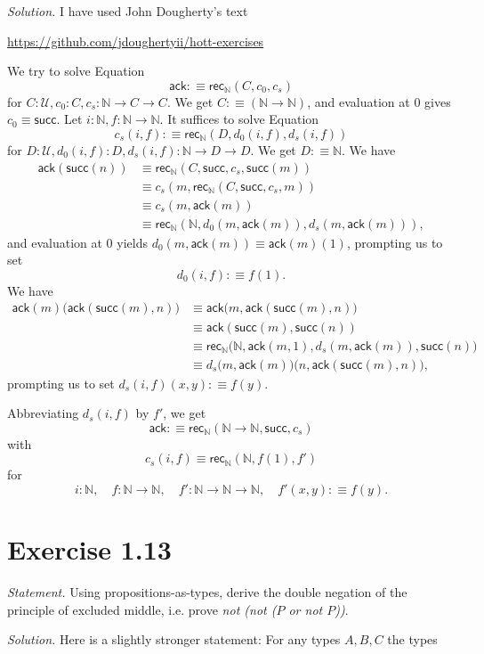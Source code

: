 \documentclass[12pt]{article}
\newcommand{\ack}{\mathsf{ack}}
\newcommand{\N}{\mathbb N}
\newcommand{\nn}{\noindent}
\newcommand{\rec}{\mathsf{rec}}
\newcommand{\su}{\mathsf{succ}}
\newcommand{\U}{\mathcal U}
\begin{document}
\nn\emph{Solution.} I have used John Dougherty's text 

\nn\href{https://github.com/jdoughertyii/hott-exercises}{https://github.com/jdoughertyii/hott-exercises}

We try to solve Equation 
\begin{equation}\label{ack1}
\ack:\equiv\rec_\N(C,c_0,c_s)
\end{equation}
for $C:\U,c_0:C,c_s:\N\to C\to C$. We get $C:\equiv(\N\to\N)$, and evaluation at 0 gives $c_0\equiv\su$. Let $i:\N,f:\N\to\N$. It suffices to solve Equation 
\begin{equation}\label{ack2}
c_s(i,f):\equiv\rec_\N(D,d_0(i,f),d_s(i,f))
\end{equation}
for $D:\U,d_0(i,f):D,d_s(i,f):\N\to D\to D$. We get $D:\equiv\N$. We have
\begin{align*}
\ack(\su(n))&\equiv\rec_\N(C,\su,c_s,\su(m))\\
&\equiv c_s(m,\rec_\N(C,\su,c_s,m))\\
&\equiv c_s(m,\ack(m))\\
&\equiv\rec_\N(\N,d_0(m,\ack(m)),d_s(m,\ack(m))),
\end{align*}
and evaluation at 0 yields $d_0(m,\ack(m))\equiv\ack(m)(1)$, prompting us to set $$d_0(i,f):\equiv f(1).$$ We have 
\begin{align*}
\ack(m)\big(\ack(\su(m),n)\big)&\equiv\ack\big(m,\ack(\su(m),n)\big)\\ 
&\equiv\ack(\su(m),\su(n))\\ 
&\equiv\rec_\N\big(\N,\ack(m,1),d_s(m,\ack(m)),\su(n)\big)\\
&\equiv d_s\big(m,\ack(m)\big)\big(n,\ack(\su(m),n)\big),
\end{align*}
prompting us to set $d_s(i,f)(x,y):\equiv f(y)$. 

Abbreviating $d_s(i,f)$ by $f'$, we get 
$$
\ack:\equiv\rec_\N(\N\to\N,\su,c_s)
$$ 
with 
$$ 
c_s(i,f)\equiv\rec_\N(\N,f(1),f')
$$ 
for 
$$ 
i:\N,\quad f:\N\to\N,\quad f':\N\to\N\to\N,\quad f'(x,y):\equiv f(y).
$$


\section{Exercise 1.13}

\emph{Statement.} Using propositions-as-types, derive the double negation of the principle of excluded middle, i.e. prove \emph{not (not ($P$ or not $P$))}.

\nn\emph{Solution.} Here is a slightly stronger statement: For any types $A,B,C$ the types
\end{document}
